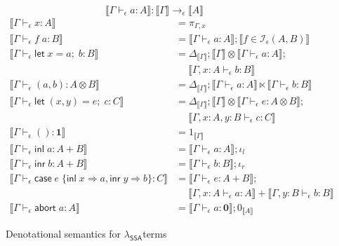 \documentclass[acmsmall,screen,review]{acmart}
\newcommand{\mc}[1]{\ensuremath{\mathcal{#1}}}
\newcommand{\mb}[1]{\ensuremath{\mathbf{#1}}}
\newcommand{\ms}[1]{\ensuremath{\mathsf{#1}}}
\newcommand{\lto}{\Rightarrow}
\newcommand{\linl}[1]{\ms{inl}\;{#1}}
\newcommand{\linr}[1]{\ms{inr}\;{#1}}
\newcommand{\labort}[1]{\ms{abort}\;{#1}}
\newcommand{\letexpr}[3]{\ensuremath{\ms{let}\;#1 = #2;\;#3}}
\newcommand{\caseexpr}[5]{\ms{case}\;#1\;\{\linl{#2} \lto #3, \linr{#4} \lto #5\}}
\newcommand{\bhyp}[2]{#1 : #2}
\newcommand{\hasty}[4]{#1 \vdash_{#2} #3: {#4}}
\newcommand{\isop}[4]{#1 \in \mc{I}_{#4}(#2, #3)}
\newcommand{\dnt}[1]{\llbracket{#1}\rrbracket}
\newcommand{\isotopessa}{\(\lambda_{\ms{SSA}}\)}
\begin{document}
\begin{figure}[H]
  \begin{equation*}
    \boxed{\dnt{\hasty{\Gamma}{\epsilon}{a}{A}} : \dnt{\Gamma} \to_\epsilon \dnt{A}}
  \end{equation*}
  \begin{align*}
    \dnt{\hasty{\Gamma}{\epsilon}{x}{A}} &= \pi_{\Gamma, x} \\
    \dnt{\hasty{\Gamma}{\epsilon}{f\;a}{B}} 
      &= \dnt{\hasty{\Gamma}{\epsilon}{a}{A}} ; \dnt{\isop{f}{A}{B}{\epsilon}} \\
    \dnt{\hasty{\Gamma}{\epsilon}{\letexpr{x}{a}{b}}{B}}
      &= \Delta_{\dnt{\Gamma}}
      ; \dnt{\Gamma} \otimes \dnt{\hasty{\Gamma}{\epsilon}{a}{A}};
      \\&\quad\; 
      \dnt{\hasty{\Gamma, \bhyp{x}{A}}{\epsilon}{b}{B}}
      \\
    \dnt{\hasty{\Gamma}{\epsilon}{(a, b)}{A \otimes B}} 
      &= \Delta_{\dnt{\Gamma}}
      ; \dnt{\hasty{\Gamma}{\epsilon}{a}{A}} \ltimes \dnt{\hasty{\Gamma}{\epsilon}{b}{B}}
      \\
    \dnt{\hasty{\Gamma}{\epsilon}{\letexpr{(x, y)}{e}{c}}{C}}
      &= \Delta_{\dnt{\Gamma}}
      ; \dnt{\Gamma} \otimes \dnt{\hasty{\Gamma}{\epsilon}{e}{A \otimes B}} ;
      \\&\quad\; 
      \dnt{\hasty{\Gamma, \bhyp{x}{A}, \bhyp{y}{B}}{\epsilon}{c}{C}}
      \\
    \dnt{\hasty{\Gamma}{\epsilon}{()}{\mb{1}}} &= 1_{\dnt{\Gamma}} \\
    \dnt{\hasty{\Gamma}{\epsilon}{\linl{a}}{A + B}}
      &= \dnt{\hasty{\Gamma}{\epsilon}{a}{A}} ; \iota_l \\
    \dnt{\hasty{\Gamma}{\epsilon}{\linr{b}}{A + B}}
      &= \dnt{\hasty{\Gamma}{\epsilon}{b}{B}} ; \iota_r \\
    \dnt{\hasty{\Gamma}{\epsilon}{\caseexpr{e}{x}{a}{y}{b}}{C}}
      &= \dnt{\hasty{\Gamma}{\epsilon}{e}{A + B}}
      ; \\& \quad\; 
      \dnt{\hasty{\Gamma, \bhyp{x}{A}}{\epsilon}{a}{A}}
      + \dnt{\hasty{\Gamma, \bhyp{y}{B}}{\epsilon}{b}{B}}
      \\
    \dnt{\hasty{\Gamma}{\epsilon}{\labort{a}}{A}} 
      &= \dnt{\hasty{\Gamma}{\epsilon}{a}{\mb{0}}} ; 0_{\dnt{A}}
  \end{align*}
  \caption{Denotational semantics for \isotopessa terms}
  \label{fig:ssa-term-sem}
\end{figure}
\end{document}
